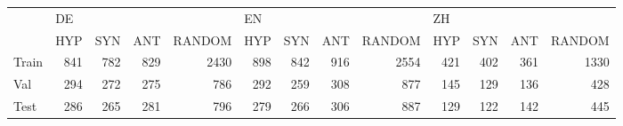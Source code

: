 \begin{tabular}{lrrrrrrrrrrrr}
\toprule
{} & \multicolumn{4}{l}{DE} & \multicolumn{4}{l}{EN} & \multicolumn{4}{l}{ZH} \\
{} &  HYP &  SYN &  ANT & RANDOM &  HYP &  SYN &  ANT & RANDOM &  HYP &  SYN &  ANT & RANDOM \\
\midrule
Train &  841 &  782 &  829 &   2430 &  898 &  842 &  916 &   2554 &  421 &  402 &  361 &   1330 \\
Val   &  294 &  272 &  275 &    786 &  292 &  259 &  308 &    877 &  145 &  129 &  136 &    428 \\
Test  &  286 &  265 &  281 &    796 &  279 &  266 &  306 &    887 &  129 &  122 &  142 &    445 \\
\bottomrule
\end{tabular}
